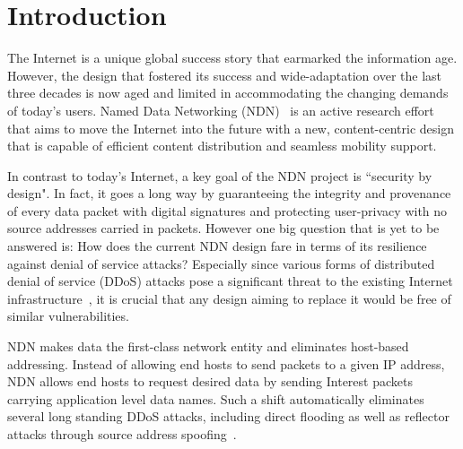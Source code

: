 \section{Introduction}
\label{sec:intro}





The Internet is a unique global success story that earmarked the information age. However, the design that fostered its success and wide-adaptation over the last three decades is now aged and limited in accommodating the changing demands of today's users. Named Data Networking (NDN)~\cite{ndn-conext, ndn-tr} is an active research effort that aims to move the Internet into the future with a new, content-centric design that is capable of efficient content distribution and seamless mobility support. 

In contrast to today's Internet, a key goal of the NDN project is ``security by design". In fact, it goes a long way by guaranteeing the integrity and provenance of every data packet with digital signatures and protecting user-privacy with no source addresses carried in packets. However one big question that is yet to be answered is: How does the current NDN design fare in terms of its resilience against denial of service attacks? Especially since various forms of distributed denial of service (DDoS) attacks pose a significant threat to the existing Internet infrastructure~\cite{arbor-report}, it is crucial that any design aiming to replace it would be free of similar vulnerabilities.

NDN makes data the first-class network entity and eliminates host-based addressing. Instead of allowing end hosts to send packets
to a given IP address, NDN allows end hosts to request desired
data by sending Interest packets carrying application level
data names. Such a shift automatically eliminates several long
standing DDoS attacks, including direct flooding as well
as reflector attacks through source address spoofing~\cite{mirkovic2004taxonomy}.

